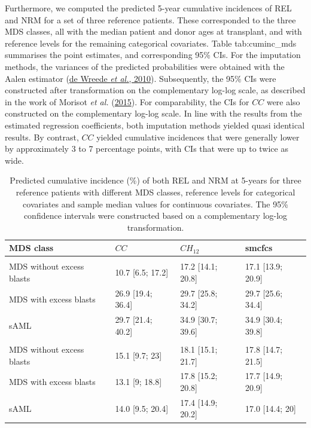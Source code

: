 \documentclass[
  letterpaper,
  DIV=11,
  numbers=noendperiod]{scrreprt}
\begin{document}
Furthermore, we computed the predicted 5-year cumulative incidences of
REL and NRM for a set of three reference patients. These corresponded to
the three MDS classes, all with the median patient and donor ages at
transplant, and with reference levels for the remaining categorical
covariates. Table tab:cuminc\_mds summarises the point estimates, and
corresponding 95\% CIs. For the imputation methods, the variances of the
predicted probabilities were obtained with the Aalen estimator
(\protect\hyperlink{ref-dewreedeMstatePackageEstimation2010}{de Wreede
\emph{et al.}, 2010}). Subsequently, the 95\% CIs were constructed after
transformation on the complementary log-log scale, as described in the
work of Morisot \emph{et al.}
(\protect\hyperlink{ref-morisotProstateCancerNet2015}{2015}). For
comparability, the CIs for \(CC\) were also constructed on the
complementary log-log scale. In line with the results from the estimated
regression coefficients, both imputation methods yielded quasi identical
results. By contrast, \(CC\) yielded cumulative incidences that were
generally lower by approximately 3 to 7 percentage points, with CIs that
were up to twice as wide.

\hypertarget{tbl-cuminc-mds}{}
\begin{table}
\caption{\label{tbl-cuminc-mds}Predicted cumulative incidence (\%) of both REL and NRM at 5-years for
three reference patients with different MDS classes, reference levels
for categorical covariates and sample median values for continuous
covariates. The 95\% confidence intervals were constructed based on a
complementary log-log transformation. }\tabularnewline

\centering
\begin{tabular}[t]{llll}
\toprule
MDS class & $CC$ & $CH_{12}$ & smcfcs\\
\midrule
\addlinespace[0.3em]
\multicolumn{4}{l}{\textbf{REL}}\\
\hspace{1em}MDS without excess blasts & 10.7 [6.5; 17.2] & 17.2 [14.1; 20.8] & 17.1 [13.9; 20.9]\\
\hspace{1em}MDS with excess blasts & 26.9 [19.4; 36.4] & 29.7 [25.8; 34.2] & 29.7 [25.6; 34.4]\\
\hspace{1em}sAML & 29.7 [21.4; 40.2] & 34.9 [30.7; 39.6] & 34.9 [30.4; 39.8]\\
\addlinespace[0.3em]
\multicolumn{4}{l}{\textbf{NRM}}\\
\hspace{1em}MDS without excess blasts & 15.1 [9.7; 23] & 18.1 [15.1; 21.7] & 17.8 [14.7; 21.5]\\
\hspace{1em}MDS with excess blasts & 13.1 [9; 18.8] & 17.8 [15.2; 20.8] & 17.7 [14.9; 20.9]\\
\hspace{1em}sAML & 14.0 [9.5; 20.4] & 17.4 [14.9; 20.2] & 17.0 [14.4; 20]\\
\bottomrule
\end{tabular}
\end{table}
\end{document}
